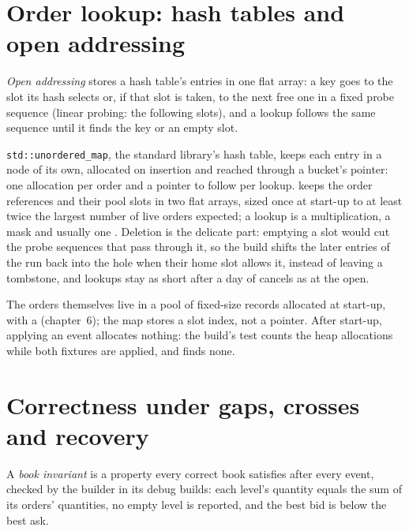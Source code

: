 \section{Order lookup: hash tables and open addressing}

\begin{definition}\label{def:ll:the-order-book-builder:open}
\emph{Open addressing} stores a hash table's entries in one flat array: a key goes to the slot its hash
selects or, if that slot is taken, to the next free one in a fixed probe sequence (linear probing: the following slots), and a
lookup follows the same sequence until it finds the key or an empty slot.
\end{definition}

\texttt{std::unordered\_map}, the standard library's hash table, keeps each entry in a node of its own, allocated on insertion
and reached through a bucket's pointer: one allocation per order and a pointer to follow per lookup.  keeps
the order references and their pool slots in two flat arrays, sized once at start-up to at least twice the largest number of
live orders expected; a lookup is a multiplication, a mask and usually one . Deletion is the delicate part: emptying
a slot would cut the probe sequences that pass through it, so the build shifts the later entries of the run back into the hole
when their home slot allows it, instead of leaving a tombstone, and lookups stay as short after a day of cancels as at the
open.

\label{lst:ll:the-order-book-builder:erase}

The orders themselves live in a pool of fixed-size records allocated at start-up, with a  (chapter~6); the map stores
a slot index, not a pointer. After start-up, applying an event allocates nothing: the build's test counts the heap allocations
while both fixtures are applied, and finds none.

\section{Correctness under gaps, crosses and recovery}

\begin{definition}\label{def:ll:the-order-book-builder:invariant}
A \emph{book invariant} is a property every correct book satisfies after every event, checked by the builder in its debug
builds: each level's quantity equals the sum of its orders' quantities, no empty level is reported, and the best bid is below
the best ask.
\end{definition}

